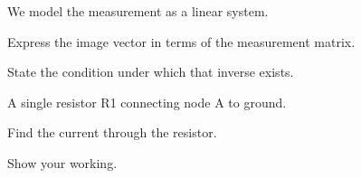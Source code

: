 \documentclass[sol]{latexally-assignment}
\begin{document}
\def\title{Homework 9}

\maketitle

\begin{qunlist}


We model the measurement as a linear system.

\begin{enumerate}
\qitem
Express the image vector in terms of the measurement matrix.


\qitem
State the condition under which that inverse exists.

\end{enumerate}


\begin{Described}{A single resistor R1 connecting node A to ground.}
\end{Described}

\begin{enumerate}
\qitem
Find the current through the resistor.

\end{enumerate}


\begin{enumerate}
\qitem
Show your working.

\end{enumerate}

\end{qunlist}
\end{document}

